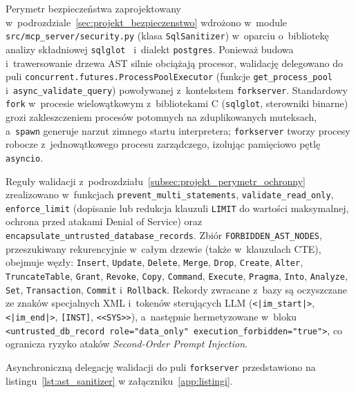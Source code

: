 Perymetr bezpieczeństwa zaprojektowany w~podrozdziale~\ref{sec:projekt_bezpieczenstwo} wdrożono w~module  \texttt{src/mcp\_server/security.py} (klasa \texttt{SqlSanitizer}) w~oparciu o~bibliotekę analizy składniowej \texttt{sqlglot}~\cite{sqlglot} i~dialekt \texttt{postgres}. Ponieważ budowa i~trawersowanie drzewa AST silnie obciążają procesor, walidację delegowano do puli \texttt{concurrent.futures.ProcessPoolExecutor} (funkcje \texttt{get\_process\_pool} i~\texttt{async\_validate\_query}) powoływanej z~kontekstem \texttt{forkserver}. Standardowy \texttt{fork} w~procesie wielowątkowym z~bibliotekami C (\texttt{sqlglot}, sterowniki binarne) grozi zakleszczeniem procesów potomnych na zduplikowanych muteksach, a~\texttt{spawn} generuje narzut zimnego startu interpretera; \texttt{forkserver} tworzy procesy robocze z~jednowątkowego procesu zarządczego, izolując pamięciowo pętlę \texttt{asyncio}.

Reguły walidacji z~podrozdziału~\ref{subsec:projekt_perymetr_ochronny} zrealizowano w~funkcjach \texttt{prevent\_multi\_statements}, \texttt{validate\_read\_only}, \texttt{enforce\_limit} (dopisanie lub redukcja klauzuli \texttt{LIMIT} do wartości maksymalnej, ochrona przed atakami Denial of Service) oraz \texttt{encapsulate\_untrusted\_database\_records}. Zbiór \texttt{FORBIDDEN\_AST\_NODES}, przeszukiwany rekurencyjnie w~całym drzewie (także w~klauzulach CTE), obejmuje węzły: \texttt{Insert}, \texttt{Update}, \texttt{Delete}, \texttt{Merge}, \texttt{Drop}, \texttt{Create}, \texttt{Alter}, \texttt{TruncateTable}, \texttt{Grant}, \texttt{Revoke}, \texttt{Copy}, \texttt{Command}, \texttt{Execute}, \texttt{Pragma}, \texttt{Into}, \texttt{Analyze}, \texttt{Set}, \texttt{Transaction}, \texttt{Commit} i~\texttt{Rollback}. Rekordy zwracane z~bazy są oczyszczane ze znaków specjalnych XML i~tokenów sterujących LLM (\texttt{<|im\_start|>}, \texttt{<|im\_end|>}, \texttt{[INST]}, \texttt{<<SYS>>}), a~następnie hermetyzowane w~bloku \texttt{<untrusted\_db\_record role="data\_only" execution\_forbidden="true">}, co ogranicza ryzyko ataków \emph{Second-Order Prompt Injection}.

Asynchroniczną delegację walidacji do puli \texttt{forkserver} przedstawiono na listingu~\ref{lst:ast_sanitizer} w załączniku~\ref{app:listingi}.

